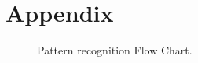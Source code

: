 \chapter{Appendix}

\begin{figure}[ht]\centering
{}
\caption{Pattern recognition Flow Chart.}
\label{fig:uml_pattern_recognition}
\end{figure}

